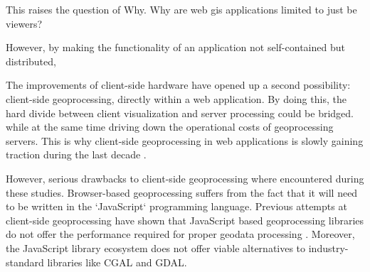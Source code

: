 This raises the question of Why. Why are web \ac{gis} applications limited to just be viewers?

% 
% 

However, by making the functionality of an application not self-contained but distributed, 

The improvements of client-side hardware have opened up a second possibility: client-side geoprocessing, directly within a web application. By doing this, the hard divide between client visualization and server processing could be bridged.  while at the same time driving down the operational costs of geoprocessing servers. This is why client-side \ac{geoprocessing} in web applications is slowly gaining traction during the last decade \cite{kulawiak_analysis_2019, panidi_hybrid_2015, hamilton_client-side_2014}. 


However, serious drawbacks to client-side geoprocessing where encountered during these studies. Browser-based geoprocessing suffers from the fact that it will need to be written in the `JavaScript` programming language. Previous attempts at client-side geoprocessing have shown that JavaScript based geoprocessing libraries do not offer the performance required for proper geodata processing \cite{hamilton_client-side_2014}. 
Moreover, the JavaScript library ecosystem does not offer viable alternatives to industry-standard libraries like CGAL and GDAL. 

